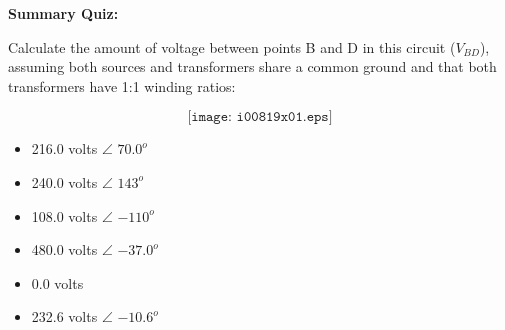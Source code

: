 \vfil \eject

\noindent
{\bf Summary Quiz:}

Calculate the amount of voltage between points B and D in this circuit ($V_{BD}$), assuming both sources and transformers share a common ground and that both transformers have 1:1 winding ratios:

$$\texttt{[image: i00819x01.eps]}$$

\begin{itemize}
\item{} 216.0 volts $\angle$ $70.0^o$
\vskip 5pt 
\item{} 240.0 volts $\angle$ $143^o$
\vskip 5pt 
\item{} 108.0 volts $\angle$ $-110^o$
\vskip 5pt 
\item{} 480.0 volts $\angle$ $-37.0^o$ 
\vskip 5pt 
\item{} 0.0 volts
\vskip 5pt 
\item{} 232.6 volts $\angle$ $-10.6^{o}$
\end{itemize}




